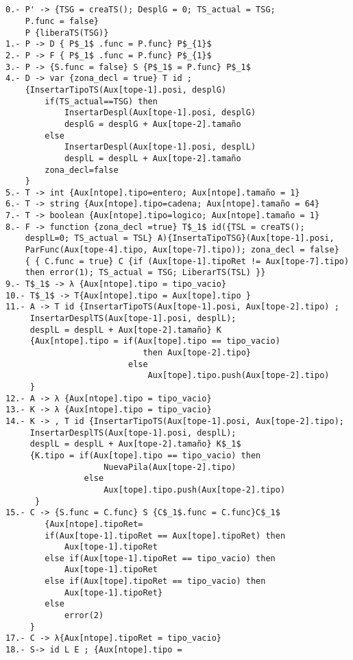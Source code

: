 \documentclass[a4paper, 12pt]{article}
\begin{document}
\begin{lstlisting}[style=EstadosAutomataST]


0.- P' -> {TSG = creaTS(); DesplG = 0; TS_actual = TSG;
    P.func = false}
    P {liberaTS(TSG)}
1.- P -> D { P$_1$ .func = P.func} P$_{1}$
2.- P -> F { P$_1$ .func = P.func} P$_{1}$
3.- P -> {S.func = false} S {P$_1$ = P.func} P$_1$
4.- D -> var {zona_decl = true} T id ;
    {InsertarTipoTS(Aux[tope-1].posi, desplG)
        if(TS_actual==TSG) then
            InsertarDespl(Aux[tope-1].posi, desplG)
            desplG = desplG + Aux[tope-2].tamaño
        else
            InsertarDespl(Aux[tope-1].posi, desplL)
            desplL = desplL + Aux[tope-2].tamaño
        zona_decl=false
    }
5.- T -> int {Aux[ntope].tipo=entero; Aux[ntope].tamaño = 1}
6.- T -> string {Aux[ntope].tipo=cadena; Aux[ntope].tamaño = 64}
7.- T -> boolean {Aux[ntope].tipo=logico; Aux[ntope].tamaño = 1}
8.- F -> function {zona_decl =true} T$_1$ id({TSL = creaTS();
    desplL=0; TS_actual = TSL} A){InsertaTipoTSG}(Aux[tope-1].posi,
    ParFunc(Aux[tope-4].tipo, Aux[tope-7].tipo)); zona_decl = false}
    { { C.func = true} C {if (Aux[tope-1].tipoRet != Aux[tope-7].tipo)
    then error(1); TS_actual = TSG; LiberarTS(TSL) }}
9.- T$_1$ -> λ {Aux[ntope].tipo = tipo_vacio}
10.- T$_1$ -> T{Aux[ntope].tipo = Aux[tope].tipo }
11.- A -> T id {InsertarTipoTS(Aux[tope-1].posi, Aux[tope-2].tipo) ;
     InsertarDesplTS(Aux[tope-1].posi, desplL);
     desplL = desplL + Aux[tope-2].tamaño} K
     {Aux[ntope].tipo = if(Aux[tope].tipo == tipo_vacio)
                            then Aux[tope-2].tipo}
                         else
                             Aux[tope].tipo.push(Aux[tope-2].tipo)
     }
12.- A -> λ {Aux[ntope].tipo = tipo_vacio}
13.- K -> λ {Aux[ntope].tipo = tipo_vacio}
14.- K -> , T id {InsertarTipoTS(Aux[tope-1].posi, Aux[tope-2].tipo);
     InsertarDesplTS(Aux[tope-1].posi, desplL);
     desplL = desplL + Aux[tope-2].tamaño} K$_1$
     {K.tipo = if(Aux[tope].tipo == tipo_vacio) then
                    NuevaPila(Aux[tope-2].tipo)
                else
                    Aux[tope].tipo.push(Aux[tope-2].tipo)
      }
15.- C -> {S.func = C.func} S {C$_1$.func = C.func}C$_1$
        {Aux[ntope].tipoRet=
        if(Aux[tope-1].tipoRet == Aux[tope].tipoRet) then
            Aux[tope-1].tipoRet
        else if(Aux[tope-1].tipoRet == tipo_vacio) then
            Aux[tope-1].tipoRet
        else if(Aux[tope].tipoRet == tipo_vacio) then
            Aux[tope-1].tipoRet}
        else
            error(2)
     }
17.- C -> λ{Aux[ntope].tipoRet = tipo_vacio}
18.- S-> id L E ; {Aux[ntope].tipo =

\end{lstlisting}
\end{document}
